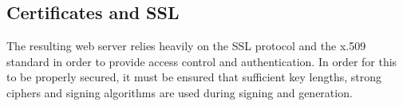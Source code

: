 \subsection {Certificates and SSL}

The resulting web server relies heavily on the SSL protocol and the x.509 standard in order to provide access control and authentication. In order for this to be properly secured, it must be ensured that sufficient key lengths, strong ciphers and signing algorithms are used during signing and generation. \cite{cipher} 




